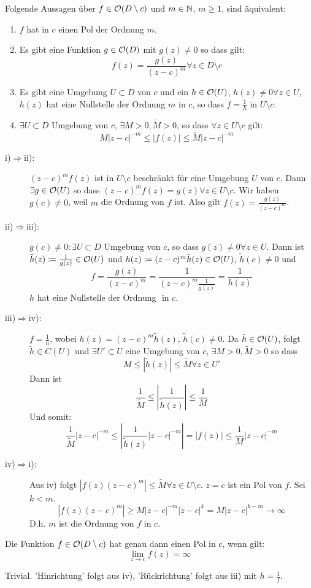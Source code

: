 \begin{satz}
	Folgende Aussagen \"uber $ f\in\mathcal O(D\setminus c) $ und $ m\in\mathbb{N} $, $ m\geq 1 $, sind \"aquivalent:
	\begin{enumerate}
		\item $ f $ hat in $ c $ einen Pol der Ordnung $ m $.
		\item Es gibt eine Funktion $ g\in\mathcal O(D) $ mit $ g(z)\neq 0 $ so dass gilt:
		\[ f(z)=\frac{g(z)}{(z-c)^m}\forall z\in D\setminus c \]
		\item Es gibt eine Umgebung $ U\subset D $ von $ c $ und ein $ h\in\mathcal O(U) $, $ h(z)\neq 0\forall z\in U $, $ h(z) $ hat eine Nullstelle der Ordnung $ m $ in $ c $, so dass $ f=\frac{1}{h}$ in $ U\setminus c $.
		\item $ \exists U\subset D $ Umgebung von $ c $, $ \exists M>0,\tilde M>0 $, so dass $ \forall z\in U\setminus c $ gilt:
		\[ M|z-c|^{-m}\leq |f(z)|\leq\tilde M|z-c|^{-m} \]
	\end{enumerate}  
\end{satz}
\newpage
\begin{beweis}
	\begin{description}
		\item[i)$ \Rightarrow $ii):] $ (z-c)^mf(z) $ ist in $ U\setminus c $ beschr\"ankt f\"ur eine Umgebung $ U $ von $ c $. Dann $ \exists g\in\mathcal O(U) $ so dass $ (z-c)^mf(z)=g(z)\forall z\in U\setminus c $. Wir haben $ g(c)\neq 0 $, weil $ m $ die Ordnung von $ f $ ist. Also gilt $ f(z)=\frac{g(z)}{(z-c)^m} $.
		\item[ii)$ \Rightarrow $iii):] $ g(c)\neq 0:\exists U\subset D $ Umgebung von $ c $, so dass $ g(z)\neq 0\forall z\in U $. Dann ist $ \tilde h(z)\coloneqq\frac{1}{g(z)}\in\mathcal O(U) $ und $ h(z)\coloneqq (z-c)^m\tilde h(z)\in\mathcal O(U) $, $ \tilde h(c)\neq 0 $ und \[ f=\frac{g(z)}{(z-c)^m}=\frac{1}{(z-c)^m\frac{1}{g(z)}}=\frac{1}{h(z)} \] 
		$ h $ hat eine Nullstelle der Ordnung $  $ in $ c $.
	\item[iii)$ \Rightarrow $iv):] $ f=\frac{1}{h} $, wobei $ h(z)=(z-c)^m\tilde h(z) $, $ \tilde h(c)\neq 0 $. Da $ \tilde h\in\mathcal O(U) $, folgt $ \tilde h\in C(U) $ und $ \exists U'\subset U $ eine Umgebung von $ c $, $ \exists M>0,\tilde M>0 $ so dass
	\[ M\leq|\tilde h(z)|\leq\tilde M\forall z\in U' \]
	Dann ist
	\[ \frac{1}{\tilde M}\leq\left|\frac{1}{\tilde h(z)}\right|\leq\frac{1}{M} \]
	Und somit:
	\[ \frac{1}{\tilde M}|z-c|^{-m}\leq\left|\frac{1}{\tilde h(z)}|z-c|^{-m}\right|=|f(z)|\leq\frac{1}{M}|z-c|^{-m} \]
	\item[iv)$ \Rightarrow $i):] Aus iv) folgt $ |f(z)(z-c)^m|\leq\tilde M\forall z\in U\setminus c $. $ z=c $ ist ein Pol von $ f $. Sei $ k<m $.
	\[ |f(z)(z-c)^m|\geq M|z-c|^{-m}|z-c|^k=M|z-c|^{k-m}\rightarrow\infty \]
	D.h. $ m $ ist die Ordnung von $ f $ in $ c $.
	\end{description}
\end{beweis}
\begin{korollar}
	Die Funktion $ f\in\mathcal O(D\setminus c) $ hat genau dann einen Pol in $ c $, wenn gilt:
	\[ \lim_{z\to c} f(z)=\infty \]
\end{korollar}
\begin{beweis}
	Trivial. 'Hinrichtung' folgt aus iv), 'R\"uckrichtung' folgt aus iii) mit $ h=\frac{1}{f} $.
\end{beweis}
\newpage
